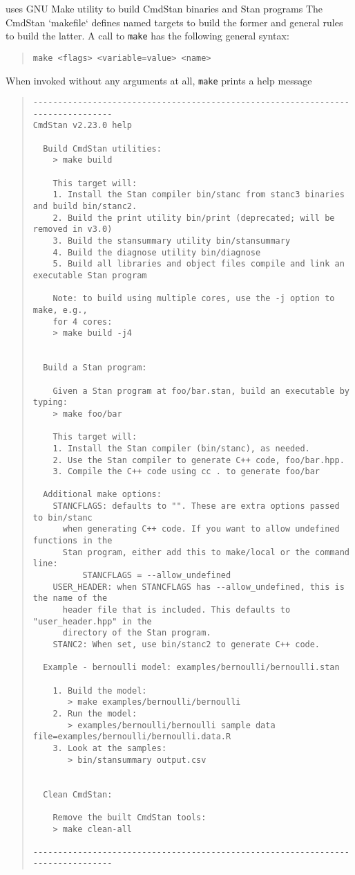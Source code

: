 \CmdStan uses GNU Make utility to build CmdStan binaries and Stan programs
The CmdStan `makefile` defines named targets to build the former and
general rules to build the latter.
A call to {\tt make} has the following general syntax:
%
\begin{quote}
\begin{Verbatim}[fontshape=sl]
make <flags> <variable=value> <name>
\end{Verbatim}
\end{quote}
%
When invoked without any arguments at all, {\tt make} prints a help message
%
\begin{quote}
\begin{Verbatim}[fontshape=sl, fontsize=\footnotesize]
--------------------------------------------------------------------------------
CmdStan v2.23.0 help

  Build CmdStan utilities:
    > make build

    This target will:
    1. Install the Stan compiler bin/stanc from stanc3 binaries and build bin/stanc2.
    2. Build the print utility bin/print (deprecated; will be removed in v3.0)
    3. Build the stansummary utility bin/stansummary
    4. Build the diagnose utility bin/diagnose
    5. Build all libraries and object files compile and link an executable Stan program

    Note: to build using multiple cores, use the -j option to make, e.g., 
    for 4 cores:
    > make build -j4


  Build a Stan program:

    Given a Stan program at foo/bar.stan, build an executable by typing:
    > make foo/bar

    This target will:
    1. Install the Stan compiler (bin/stanc), as needed.
    2. Use the Stan compiler to generate C++ code, foo/bar.hpp.
    3. Compile the C++ code using cc . to generate foo/bar

  Additional make options:
    STANCFLAGS: defaults to "". These are extra options passed to bin/stanc
      when generating C++ code. If you want to allow undefined functions in the
      Stan program, either add this to make/local or the command line:
          STANCFLAGS = --allow_undefined
    USER_HEADER: when STANCFLAGS has --allow_undefined, this is the name of the
      header file that is included. This defaults to "user_header.hpp" in the
      directory of the Stan program.
    STANC2: When set, use bin/stanc2 to generate C++ code.

  Example - bernoulli model: examples/bernoulli/bernoulli.stan

    1. Build the model:
       > make examples/bernoulli/bernoulli
    2. Run the model:
       > examples/bernoulli/bernoulli sample data file=examples/bernoulli/bernoulli.data.R
    3. Look at the samples:
       > bin/stansummary output.csv


  Clean CmdStan:

    Remove the built CmdStan tools:
    > make clean-all

--------------------------------------------------------------------------------
\end{Verbatim}
\end{quote}
